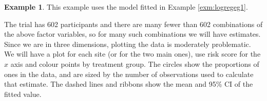 \documentclass[
  openany]{book}
\newenvironment{Shaded}{\begin{snugshade}}{\end{snugshade}}
\newcommand{\AttributeTok}[1]{\textcolor[rgb]{0.13,0.29,0.53}{#1}}
\newcommand{\CommentTok}[1]{\textcolor[rgb]{0.56,0.35,0.01}{\textit{#1}}}
\newcommand{\DecValTok}[1]{\textcolor[rgb]{0.00,0.00,0.81}{#1}}
\newcommand{\DocumentationTok}[1]{\textcolor[rgb]{0.56,0.35,0.01}{\textbf{\textit{#1}}}}
\newcommand{\FunctionTok}[1]{\textcolor[rgb]{0.13,0.29,0.53}{\textbf{#1}}}
\newcommand{\NormalTok}[1]{#1}
\newcommand{\OtherTok}[1]{\textcolor[rgb]{0.56,0.35,0.01}{#1}}
\newcommand{\SpecialCharTok}[1]{\textcolor[rgb]{0.81,0.36,0.00}{\textbf{#1}}}
\newcommand{\StringTok}[1]{\textcolor[rgb]{0.31,0.60,0.02}{#1}}
\theoremstyle{definition}
\theoremstyle{definition}
\newtheorem{example}{Example}[chapter]
\theoremstyle{definition}
\theoremstyle{definition}
\theoremstyle{remark}
\begin{document}
\begin{example}
This example uses the model fitted in Example \ref{exm:logregeg1}.

The trial has 602 participants and there are many fewer than 602 combinations of the above factor variables, so for many such combinations we will have estimates. Since we are in three dimensions, plotting the data is moderately problematic. We will have a plot for each site (or for the two main ones), use risk score for the \(x\) axis and colour points by treatment group. The circles show the proportions of ones in the data, and are sized by the number of observations used to calculate that estimate. The dashed lines and ribbons show the mean and 95\% CI of the fitted value.

\begin{Shaded}
\end{Shaded}
\end{example}
\end{document}
